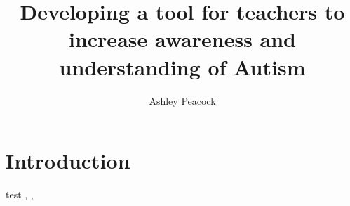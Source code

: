 \documentclass[11pt]{report}
\begin{document}
\title{Developing a tool for teachers to increase awareness and understanding of Autism}
\author{Ashley Peacock}
\maketitle

\tableofcontents


\section{Introduction}

test \cite{Matson_Kozlowski_2011}, \cite{Mayes_et_al_2013} , \cite{Gabriels_et_al_2008}

 


\end{document}

